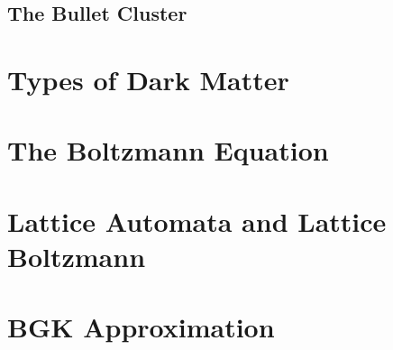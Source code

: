\subsection{The Bullet Cluster}

\section{Types of Dark Matter}

\section{The Boltzmann Equation}

\section{Lattice Automata and Lattice Boltzmann}

\section{BGK Approximation}
\label{bgk}

